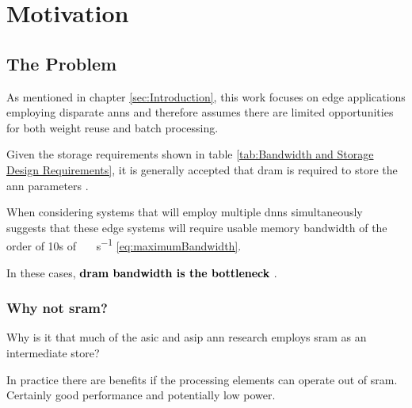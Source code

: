 



\chapter{Motivation}
\label{sec:Motivation}


\section[The Problem]{The Problem}
\label{sec:The Problem}

As mentioned in chapter \ref{sec:Introduction}, this work focuses on edge applications employing disparate \ac{ann}s and therefore assumes there are limited opportunities for both weight reuse and batch processing.

Given the storage requirements shown in table \ref{tab:Bandwidth and Storage Design Requirements}, it is generally accepted that \ac{dram} is required to store the \ac{ann} parameters \cite{dadiannao2014}\cite{dadiannao2017}\cite{azarkhish2017neurostream}.

When considering systems that will employ multiple \ac{dnn}s simultaneously suggests that these edge systems will require usable memory bandwidth of the order of 10s of \SI[per-mode=symbol]{}{\tera \bit \per \second} \eqref{eq:maximumBandwidth}.

In these cases, \textbf{\textcolor{black}{\ac{dram} bandwidth is the bottleneck} \cite{dadiannao2017}}.

\iffalse
Given the bandwidth and storage requirements shown in table \ref{tab:Bandwidth and Storage Design Requirements}, the problem becomes \hyphenquote{american}{\textbf{\textcolor{black}{to provide deterministic at or near real-time performance within tolerable power and space constraints for edge systems employing inference on multiple disparate useful-sized neural networks.}}}
\fi


\subsection{Why not \ac{sram}?}
\label{sec:Why not SRAM}

Why is it that much of the \ac{asic} and \ac{asip} \ac{ann} research employs \ac{sram} as an intermediate store? 

In practice there are benefits if the processing elements can operate out of \ac{sram}.
Certainly good performance and potentially low power. 

